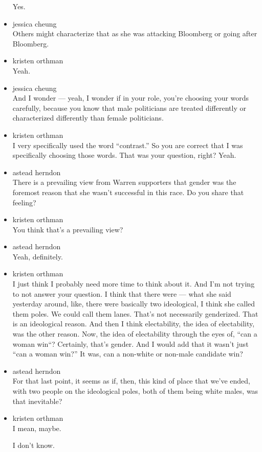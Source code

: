 \begin{itemize}
  Yes.
\item
  jessica cheung\\
  Others might characterize that as she was attacking Bloomberg or going
  after Bloomberg.
\item
  kristen orthman\\
  Yeah.
\item
  jessica cheung\\
  And I wonder --- yeah, I wonder if in your role, you're choosing your
  words carefully, because you know that male politicians are treated
  differently or characterized differently than female politicians.
\item
  kristen orthman\\
  I very specifically used the word ``contrast.'' So you are correct
  that I was specifically choosing those words. That was your question,
  right? Yeah.
\item
  astead herndon\\
  There is a prevailing view from Warren supporters that gender was the
  foremost reason that she wasn't successful in this race. Do you share
  that feeling?
\item
  kristen orthman\\
  You think that's a prevailing view?
\item
  astead herndon\\
  Yeah, definitely.
\item
  kristen orthman\\
  I just think I probably need more time to think about it. And I'm not
  trying to not answer your question. I think that there were --- what
  she said yesterday around, like, there were basically two ideological,
  I think she called them poles. We could call them lanes. That's not
  necessarily genderized. That is an ideological reason. And then I
  think electability, the idea of electability, was the other reason.
  Now, the idea of electability through the eyes of, ``can a woman
  win``? Certainly, that's gender. And I would add that it wasn't just
  ``can a woman win?'' It was, can a non-white or non-male candidate
  win?
\item
  astead herndon\\
  For that last point, it seems as if, then, this kind of place that
  we've ended, with two people on the ideological poles, both of them
  being white males, was that inevitable?
\item
  kristen orthman\\
  I mean, maybe.

  I don't know.
\end{itemize}

